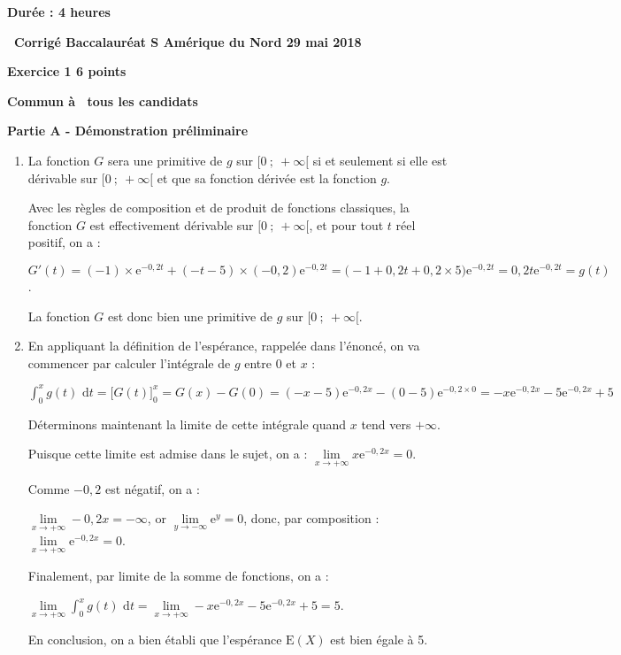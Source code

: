 \documentclass[10pt]{article}
\def\e{\text{e}}
\begin{document}
\setlength\parindent{0mm}
\pagestyle{fancy}
\thispagestyle{empty}
\begin{center}\textbf{Durée : 4 heures}

\vspace{0,5cm}

{\Large \textbf{\decofourleft~Corrigé Baccalauréat S Amérique du Nord 29 mai 2018~\decofourright}}
\end{center}

\vspace{0,5cm}

\textbf{Exercice 1 \hfill  6 points}

	\textbf{Commun à  tous les candidats}
	
	\medskip
	
	\textbf{Partie A - Démonstration préliminaire}
	
		\begin{enumerate}
			\item La fonction $G$ sera une primitive de $g$ sur $[0~;~+\infty[$ si et seulement si elle est dérivable sur $[0~;~+\infty[$ et que sa fonction dérivée est la fonction $g$.
			
			Avec les règles de composition et de produit de fonctions classiques, la fonction $G$ est effectivement dérivable sur $[0~;~+\infty[$, et pour tout $t$ réel positif, on a : 
			
$G'(t) = (- 1) \times \e^{-0,2t} + (-t-5) \times (-0,2) \e^{-0,2t} = \big(-1 + 0,2t + 0,2\times 5\big)\e^{-0,2t} = 0,2t\e^{-0,2t} = g(t)$.
			
La fonction $G$ est donc bien une primitive de $g$ sur $[0~;~+\infty[$.
			
			\item En appliquant la définition de l'espérance, rappelée dans l'énoncé, on va commencer par calculer l'intégrale de $g$ entre 0 et $x$ :
			
$\displaystyle \int_{0}^{x}g(t) \text{~d} t = \Big[G(t)\Big]_{0}^{x} = G(x) - G(0) = (-x-5)\e^{-0,2x} - (0 - 5)\e^{-0,2\times 0} = -x\e^{-0,2x} - 5\e^{-0,2x} + 5$
			
\smallskip
			
Déterminons maintenant la limite de cette intégrale quand $x$ tend vers $+\infty$.
			
Puisque cette limite est admise dans le sujet, on a : $\lim\limits_{x \to +\infty} x\e^{-0,2x} = 0$.
			
Comme $-0,2$ est négatif, on a : 
			
$\lim\limits_{x \to +\infty} -0,2x = -\infty$, or $\lim\limits_{y \to -\infty} \e^y = 0$, donc, par composition : $\lim\limits_{x \to +\infty} \e^{-0,2x} = 0$.
	
Finalement, par limite de la somme de fonctions, on a :
	
$\lim\limits_{x \to +\infty} \displaystyle \int_{0}^{x}g(t) \text{~d} t = \lim\limits_{x \to +\infty} -x\e^{-0,2x} - 5\e^{-0,2x} + 5 = 5$.

\medskip
	
En conclusion, on a bien établi que l'espérance $\text{E}(X)$ est bien égale à 5.
		\end{enumerate}
\end{document}
